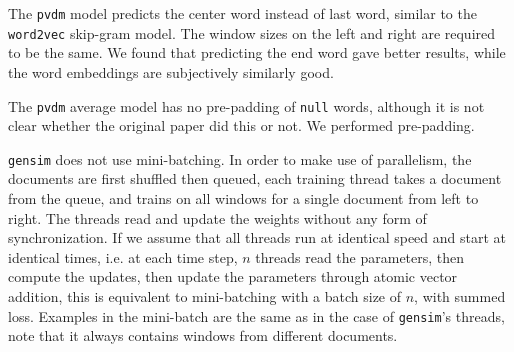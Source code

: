 \documentclass{article}
\begin{document}
\begin{appendices}
The \texttt{pvdm} model predicts the center word instead of last word, similar to the \texttt{word2vec} skip-gram model. The window sizes on the left and right are required to be the same. We found that predicting the end word gave better results, while the word embeddings are subjectively similarly good.

The \texttt{pvdm} average model has no pre-padding of \texttt{null} words, although it is not clear whether the original paper did this or not. We performed pre-padding.

\texttt{gensim} does not use mini-batching. In order to make use of parallelism, the documents are first shuffled then queued, each training thread takes a document from the queue, and trains on all windows for a single document from left to right. The threads read and update the weights without any form of synchronization. If we assume that all threads run at identical speed and start at identical times, i.e. at each time step, $n$ threads read the parameters, then compute the updates, then update the parameters through atomic vector addition, this is equivalent to mini-batching with a batch size of $n$, with summed loss. Examples in the mini-batch are the same as in the case of \texttt{gensim}'s threads, note that it always contains windows from different documents.

\end{appendices}

{}

\end{document}
